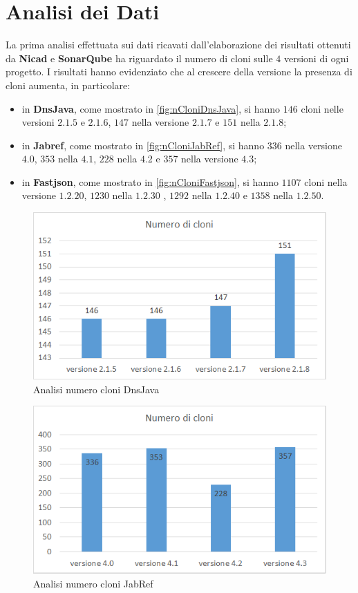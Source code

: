 \section{Analisi dei Dati}
La prima analisi effettuata sui dati ricavati dall'elaborazione dei risultati ottenuti da \textbf{Nicad} e \textbf{SonarQube} ha riguardato il numero di cloni sulle $4$ versioni di ogni progetto. I risultati hanno evidenziato che al crescere della versione la presenza di cloni aumenta, in particolare:
\begin{itemize}
	\item in \textbf{DnsJava}, come mostrato in \autoref{fig:nCloniDnsJava}, si hanno $146$ cloni nelle versioni $2.1.5$ e $2.1.6$, $147$ nella versione $2.1.7$ e $151$ nella $2.1.8$;
	\item in \textbf{Jabref}, come mostrato in \autoref{fig:nCloniJabRef}, si hanno $336$ nella versione $4.0$, $353$ nella $4.1$, $228$ nella $4.2$ e $357$ nella versione $4.3$;
	\item in \textbf{Fastjson}, come mostrato in \autoref{fig:nCloniFastjson}, si hanno $1107$ cloni nella versione $1.2.20$, $1230$ nella $1.2.30$ , $1292$ nella $1.2.40$ e $1358$ nella $1.2.50$.
\end{itemize}
\begin{figure}[h]
	\centering
	\includegraphics[scale=0.75, trim = 0cm 0cm 0cm 0cm, clip=true]{Grafici_dnsJava/NumeroCloni.png}
	\caption{Analisi numero cloni DnsJava}
	\label{fig:nCloniDnsJava}
\end{figure}
\begin{figure}[h]
	\centering
	\includegraphics[scale=0.75, trim = 0cm 0cm 0cm 0cm, clip=true]{Grafici_jabRef/NumeroCloni.png}
	\caption{Analisi numero cloni JabRef}
	\label{fig:nCloniJabRef}
\end{figure}
